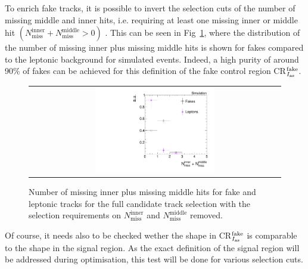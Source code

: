 To enrich fake tracks, it is possible to invert the selection cuts of the number of missing middle and inner hits, i.e. requiring at least one missing inner or middle hit $\left( N_{\text{miss}}^{\text{inner}} +N_{\text{miss}}^{\text{middle}}>0\right)$ .
This can be seen in Fig~\ref{fig:NMissInnerAndMiddle}, where the distribution of the number of missing inner plus missing middle hits is shown for fakes compared to the leptonic background for simulated \WJets events.
Indeed, a high purity of around 90\% of fakes can be achieved for this definition of the \ias fake control region CR$_{I_{\text{as}}}^{\text{fake}}$.
\begin{figure}[!b]
  \centering 
  \begin{tabular}{c}
    \includegraphics[width=0.49\textwidth]{figures/analysis/Background/NLostInnerPlusMiddleForAllBkg_chiTracksQCDsupressionTrigger.pdf}
  \end{tabular}
  \caption{Number of missing inner plus missing middle hits for fake and leptonic tracks for the full candidate track selection with the selection requirements on $N_{\text{miss}}^{\text{inner}}$ and $N_{\text{miss}}^{\text{middle}}$ removed.}
  \label{fig:NMissInnerAndMiddle}
\end{figure}

Of course, it needs also to be checked wether the \ias shape in CR$_{I_{\text{as}}}^{\text{fake}}$ is comparable to the \ias shape in the signal region.
As the exact definition of the signal region will be addressed during optimisation, this test will be done for various \pt selection cuts.

